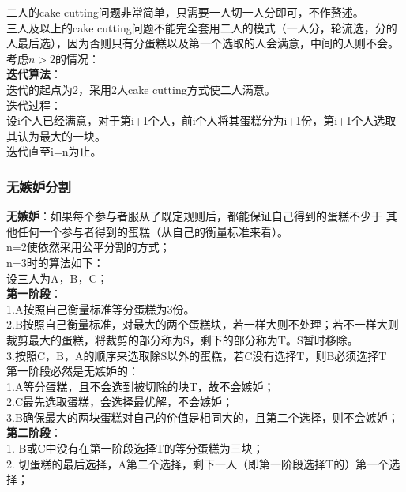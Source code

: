 \documentclass[11pt]{ctexart}
\begin{document}
二人的cake cutting问题非常简单，只需要一人切一人分即可，不作赘述。\\

三人及以上的cake cutting问题不能完全套用二人的模式（一人分，轮流选，分的人最后选），因为否则只有分蛋糕以及第一个选取的人会满意，中间的人则不会。\\

考虑$n>2$的情况：\\
\textbf{迭代算法}：\\
迭代的起点为2，采用2人cake cutting方式使二人满意。\\

迭代过程：\\
设i个人已经满意，对于第i+1个人，前i个人将其蛋糕分为i+1份，第i+1个人选取其认为最大的一块。\\

迭代直至i=n为止。\\

\subsubsection{无嫉妒分割}
\textbf{无嫉妒}：如果每个参与者服从了既定规则后，都能保证自己得到的蛋糕不少于
其他任何一个参与者得到的蛋糕（从自己的衡量标准来看）。\\

n=2使依然采用公平分割的方式；\\

n=3时的算法如下：\\
设三人为A，B，C；\\
\textbf{第一阶段}：\\
1.A按照自己衡量标准等分蛋糕为3份。\\
2.B按照自己衡量标准，对最大的两个蛋糕块，若一样大则不处理；若不一样大则裁剪最大的蛋糕，将裁剪的部分称为S，剩下的部分称为T。S暂时移除。\\
3.按照C，B，A的顺序来选取除S以外的蛋糕，若C没有选择T，则B必须选择T\\

第一阶段必然是无嫉妒的：\\
1.A等分蛋糕，且不会选到被切除的块T，故不会嫉妒；\\
2.C最先选取蛋糕，会选择最优解，不会嫉妒；\\
3.B确保最大的两块蛋糕对自己的价值是相同大的，且第二个选择，则不会嫉妒；\\

\textbf{第二阶段}：\\
1. B或C中没有在第一阶段选择T的等分蛋糕为三块；\\
2. 切蛋糕的最后选择，A第二个选择，剩下一人（即第一阶段选择T的）第一个选择；\\
\end{document}
